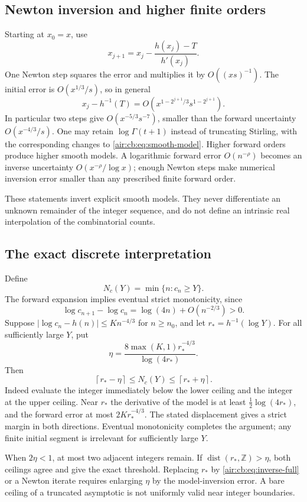 \documentclass[11pt,letterpaper]{article}
\numberwithin{equation}{section}
\theoremstyle{remark}
\begin{document}
\subsection{Newton inversion and higher finite orders}
Starting at $x_0=x$, use
\[
x_{j+1}=x_j-\frac{h(x_j)-T}{h'(x_j)}.
\]
One Newton step squares the error and multiplies it by $O((xs)^{-1})$.
The initial error is $O(x^{1/3}/s)$, so in general
\[
x_j-h^{-1}(T)=O\!\left(x^{1-2^{j+1}/3}s^{1-2^{j+1}}\right).
\]
In particular two steps give $O(x^{-5/3}s^{-7})$, smaller than the forward
uncertainty $O(x^{-4/3}/s)$. One may retain $\log\Gamma(t+1)$ instead of
truncating Stirling, with the corresponding changes to
\eqref{air:cb:eq:smooth-model}. Higher forward orders produce higher smooth models.
A logarithmic forward error $O(n^{-\rho})$ becomes an inverse uncertainty
$O(x^{-\rho}/\log x)$; enough Newton steps make numerical inversion error
smaller than any prescribed finite forward order.

These statements invert explicit smooth models. They never differentiate
an unknown remainder of the integer sequence, and do not define an intrinsic
real interpolation of the combinatorial counts.

\subsection{The exact discrete interpretation}
Define
\[
N_c(Y)=\min\{n:c_n\ge Y\}.
\]
The forward expansion implies eventual strict monotonicity, since
\[
\log c_{n+1}-\log c_n=\log(4n)+O(n^{-2/3})>0.
\]
Suppose $|\log c_n-h(n)|\le K n^{-4/3}$ for $n\ge n_0$, and let
$r_*=h^{-1}(\log Y)$. For all sufficiently large $Y$, put
\begin{equation}\label{air:cb:eq:threshold-radius}
\eta=\frac{8\max(K,1)r_*^{-4/3}}{\log(4r_*)}.
\end{equation}
Then
\begin{equation}\label{air:cb:eq:threshold-bracket}
\left\lceil r_*-\eta\right\rceil\le N_c(Y)
\le\left\lceil r_*+\eta\right\rceil.
\end{equation}
Indeed evaluate the integer immediately below the lower ceiling and the
integer at the upper ceiling. Near $r_*$ the derivative of the model is
at least $\tfrac12\log(4r_*)$, and the forward error at most
$2Kr_*^{-4/3}$. The stated displacement gives a strict margin in both
directions. Eventual monotonicity completes the argument; any finite
initial segment is irrelevant for sufficiently large $Y$.

When $2\eta<1$, at most two adjacent integers remain. If
$\operatorname{dist}(r_*,\mathbb Z)>\eta$, both ceilings agree and give the
exact threshold. Replacing $r_*$ by \eqref{air:cb:eq:inverse-full} or a Newton
iterate requires enlarging $\eta$ by the model-inversion error. A bare
ceiling of a truncated asymptotic is not uniformly valid near integer
boundaries.
\end{document}
